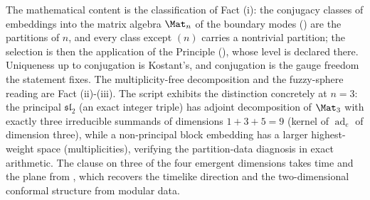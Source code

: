 The mathematical content is the classification of Fact (i): the conjugacy classes of embeddings into the matrix algebra $\Mat_n$ of the boundary modes () are the partitions of $n$, and every class except $(n)$ carries a nontrivial partition; the selection is then the application of the Principle (), whose level is declared there. Uniqueness up to conjugation is Kostant's, and conjugation is the gauge freedom the statement fixes. The multiplicity-free decomposition and the fuzzy-sphere reading are Fact (ii)-(iii). The script exhibits the distinction concretely at $n = 3$: the principal $\mathfrak{sl}_2$ (an exact integer triple) has adjoint decomposition of $\Mat_3$ with exactly three irreducible summands of dimensions $1 + 3 + 5 = 9$ (kernel of $\operatorname{ad}_e$ of dimension three), while a non-principal block embedding has a larger highest-weight space (multiplicities), verifying the partition-data diagnosis in exact arithmetic. The clause on three of the four emergent dimensions takes time and the plane from , which recovers the timelike direction and the two-dimensional conformal structure from modular data.
